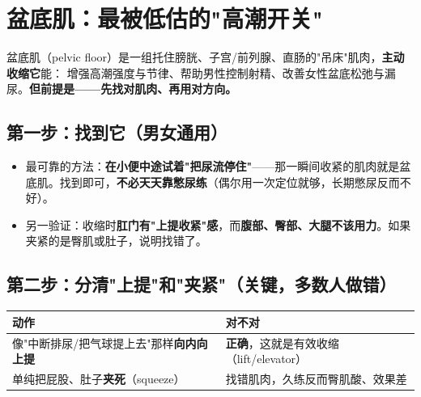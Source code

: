 \section{盆底肌：最被低估的"高潮开关"}
盆底肌（pelvic floor）是一组托住膀胱、子宫/前列腺、直肠的"吊床"肌肉，\textbf{主动收缩它}能：
增强高潮强度与节律、帮助男性控制射精、改善女性盆底松弛与漏尿。\textbf{但前提是——先找对肌肉、再用对方向。}

\subsection*{第一步：找到它（男女通用）}
\begin{itemize}[leftmargin=2em,itemsep=0.3em]
  \item 最可靠的方法：\textbf{在小便中途试着"把尿流停住"}——那一瞬间收紧的肌肉就是盆底肌。找到即可，\textbf{不必天天靠憋尿练}（偶尔用一次定位就够，长期憋尿反而不好）。
  \item 另一验证：收缩时\textbf{肛门有"上提收紧"感}，而\textbf{腹部、臀部、大腿不该用力}。如果夹紧的是臀肌或肚子，说明找错了。
\end{itemize}

\subsection*{第二步：分清"上提"和"夹紧"（关键，多数人做错）}
\begin{tabularx}{\textwidth}{l X}
\toprule
\textbf{动作} & \textbf{对不对} \\
\midrule
像"中断排尿/把气球提上去"那样\textbf{向内向上提} & \textbf{正确}，这就是有效收缩（lift/elevator） \\
单纯把屁股、肚子\textbf{夹死}（squeeze） & 找错肌肉，久练反而臀肌酸、效果差 \\
\bottomrule
\end{tabularx}

